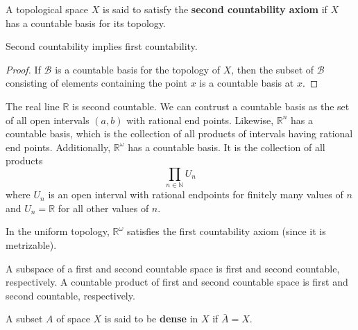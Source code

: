 \documentclass{article}
\begin{document}
    \begin{definition}
    A topological space $X$ is said to satisfy the \textbf{second countability axiom} if $X$ has a countable basis for its topology.
    \end{definition}

    \begin{proposition}
    Second countability implies first countability. 
    \end{proposition}
    \begin{proof}
    If $\mathscr{B}$ is a countable basis for the topology of $X$, then the subset of $\mathscr{B}$ consisting of elements containing the point $x$ is a countable basis at $x$. 
    \end{proof}

    \begin{example}
    The real line $\mathbb{R}$ is second countable. We can contrust a countable basis as the set of all open intervals $(a, b)$ with rational end points. Likewise, $\mathbb{R}^n$ has a countable basis, which is the collection of all products of intervals having rational end points. Additionally, $\mathbb{R}^\omega$ has a countable basis. It is the collection of all products
    \[\prod_{n \in \mathbb{N}} U_n\]
    where $U_n$ is an open interval with rational endpoints for finitely many values of $n$ and $U_n = \mathbb{R}$ for all other values of $n$. 
    \end{example}

    \begin{example}
    In the uniform topology, $\mathbb{R}^\omega$ satisfies the first countability axiom (since it is metrizable). 
    \end{example}

    \begin{theorem}
    A subspace of a first and second countable space is first and second countable, respectively. A countable product of first and second countable space is first and second countable, respectively. 
    \end{theorem}

    \begin{theorem}
    A subset $A$ of space $X$ is said to be \textbf{dense} in $X$ if $\bar{A} = X$. 
    \end{theorem}
\end{document}
